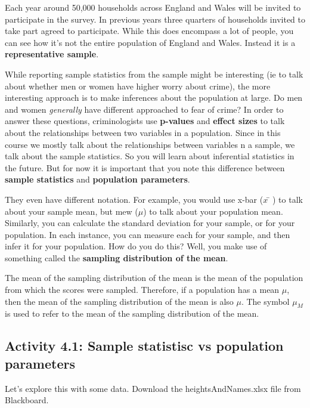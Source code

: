 \documentclass[
]{book}
\begin{document}
Each year around 50,000 households across England and Wales will be invited to participate in the survey. In previous years three quarters of households invited to take part agreed to participate. While this does encompass a lot of people, you can see how it's not the entire population of England and Wales. Instead it is a \textbf{representative sample}.

While reporting sample statistics from the sample might be interesting (ie to talk about whether men or women have higher worry about crime), the more interesting approach is to make inferences about the population at large. Do men and women \emph{generally} have different approached to fear of crime? In order to answer these questions, criminologists use \textbf{p-values} and \textbf{effect sizes} to talk about the relationships between two variables in a population. Since in this course we mostly talk about the relationships between variables n a sample, we talk about the sample statistics. So you will learn about inferential statistics in the future. But for now it is important that you note this difference between \textbf{sample statistics} and \textbf{population parameters}.

They even have different notation. For example, you would use x-bar (\(x̄\)) to talk about your sample mean, but mew (\(μ\)) to talk about your population mean. Similarly, you can calculate the standard deviation for your sample, or for your population. In each instance, you can measure each for your sample, and then infer it for your population. How do you do this? Well, you make use of something called the \textbf{sampling distribution of the mean}.

The mean of the sampling distribution of the mean is the mean of the population from which the scores were sampled. Therefore, if a population has a mean \(μ\), then the mean of the sampling distribution of the mean is also \(μ\). The symbol \(μ_M\) is used to refer to the mean of the sampling distribution of the mean.

\hypertarget{activity-4.1-sample-statistisc-vs-population-parameters}{%
\subsection{Activity 4.1: Sample statistisc vs population parameters}\label{activity-4.1-sample-statistisc-vs-population-parameters}}

Let's explore this with some data. Download the heightsAndNames.xlsx file from Blackboard.
\end{document}
